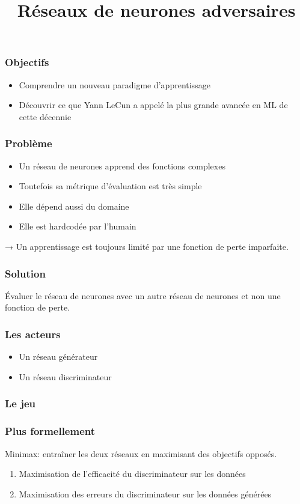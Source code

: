 \documentclass{formation}
\title{Réseaux de neurones adversaires}
\begin{document}
\maketitle

\begin{frame}
  \frametitle{Objectifs}
  \begin{itemize}
  \item Comprendre un nouveau paradigme d'apprentissage
  \item Découvrir ce que Yann LeCun a appelé la plus grande avancée en
    ML de cette décennie
  \end{itemize}
\end{frame}

\begin{frame}
  \frametitle{Problème}
  \begin{itemize}
  \item Un réseau de neurones apprend des fonctions complexes
  \item Toutefois sa métrique d'évaluation est très simple
  \item Elle dépend aussi du domaine
  \item Elle est \og hardcodée \fg{} par l'humain
  \end{itemize}
  → Un apprentissage est toujours limité par une fonction de perte
  imparfaite.
\end{frame}

\begin{frame}
  \frametitle{Solution}
  Évaluer le réseau de neurones avec un autre réseau de neurones et
  non une fonction de perte.~\cite{Goodfellow2014}
\end{frame}

\begin{frame}
  \frametitle{Les acteurs}
  \begin{itemize}
  \item Un réseau générateur
  \item Un réseau discriminateur
  \end{itemize}
\end{frame}

\begin{frame}
  \frametitle{Le jeu}
\end{frame}

\begin{frame}
  \frametitle{Plus formellement}
  Minimax: entraîner les deux réseaux en maximisant des objectifs
  opposés.
  \begin{enumerate}
  \item Maximisation de l'efficacité du discriminateur sur les données
  \item Maximisation des erreurs du discriminateur sur les données
    générées
  \end{enumerate}
\end{frame}
\end{document}
